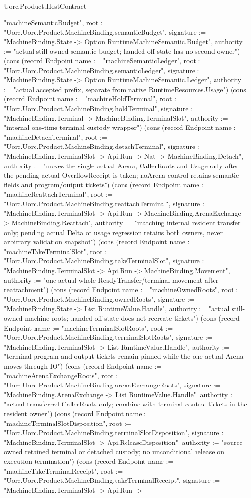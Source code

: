 \begin{lexlean}{Uorc.Product.HostContract}
\begin{semanticmodule}
{"machineSemanticBudget", root := "Uorc.Uorc.Product.MachineBinding.semanticBudget", signature := "MachineBinding.State -> Option RuntimeMachineSemantic.Budget", authority := "actual still-owned semantic budget; handed-off state has no second owner"}) (cons (record Endpoint {name := "machineSemanticLedger", root := "Uorc.Uorc.Product.MachineBinding.semanticLedger", signature := "MachineBinding.State -> Option RuntimeMachineSemantic.Ledger", authority := "actual accepted prefix, separate from native RuntimeResources.Usage"}) (cons (record Endpoint {name := "machineHoldTerminal", root := "Uorc.Uorc.Product.MachineBinding.holdTerminal", signature := "MachineBinding.Terminal -> MachineBinding.TerminalSlot", authority := "internal one-time terminal custody wrapper"}) (cons (record Endpoint {name := "machineDetachTerminal", root := "Uorc.Uorc.Product.MachineBinding.detachTerminal", signature := "MachineBinding.TerminalSlot -> Api.Run -> Nat -> MachineBinding.Detach", authority := "moves the single actual Arena, CallerRoots and Usage only after the pending actual OverflowReceipt is taken; noArena control retains semantic fields and program/output tickets"}) (cons (record Endpoint {name := "machineReattachTerminal", root := "Uorc.Uorc.Product.MachineBinding.reattachTerminal", signature := "MachineBinding.TerminalSlot -> Api.Run -> MachineBinding.ArenaExchange -> MachineBinding.Reattach", authority := "matching internal resident transfer only; pending actual Delta or usage regression retains both owners, never arbitrary validation snapshot"}) (cons (record Endpoint {name := "machineTakeTerminalSlot", root := "Uorc.Uorc.Product.MachineBinding.takeTerminalSlot", signature := "MachineBinding.TerminalSlot -> Api.Run -> MachineBinding.Movement", authority := "one actual whole ReadyTransfer/terminal movement after reattachment"}) (cons (record Endpoint {name := "machineOwnedRoots", root := "Uorc.Uorc.Product.MachineBinding.ownedRoots", signature := "MachineBinding.State -> List RuntimeValue.Handle", authority := "actual still-owned machine roots; handed-off state does not recreate tickets"}) (cons (record Endpoint {name := "machineTerminalSlotRoots", root := "Uorc.Uorc.Product.MachineBinding.terminalSlotRoots", signature := "MachineBinding.TerminalSlot -> List RuntimeValue.Handle", authority := "terminal program and output tickets remain pinned while the one actual Arena moves through IO"}) (cons (record Endpoint {name := "machineArenaExchangeRoots", root := "Uorc.Uorc.Product.MachineBinding.arenaExchangeRoots", signature := "MachineBinding.ArenaExchange -> List RuntimeValue.Handle", authority := "actual transferred CallerRoots only; combine with terminal control tickets in the resident owner"}) (cons (record Endpoint {name := "machineTerminalSlotDisposition", root := "Uorc.Uorc.Product.MachineBinding.terminalSlotDisposition", signature := "MachineBinding.TerminalSlot -> Api.ReleaseDisposition", authority := "source-owned retained terminal or detached custody; no unconditional release on execution termination"}) (cons (record Endpoint {name := "machineTakeTerminalReceipt", root := "Uorc.Uorc.Product.MachineBinding.takeTerminalReceipt", signature := "MachineBinding.TerminalSlot -> Api.Run -> }
\end{semanticmodule}
\end{lexlean}
